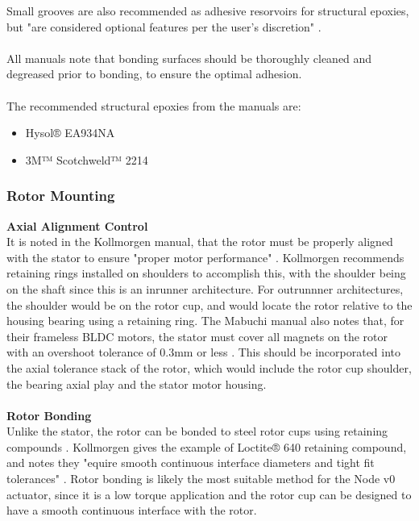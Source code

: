 \documentclass[internal]{../../classes/nervtech-research}
\begin{document}
Small grooves are also recommended as adhesive resorvoirs for structural epoxies, but "are considered optional features per the user's discretion" \cite{KollmorgenManual}.
\\\\
All manuals note that bonding surfaces should be thoroughly cleaned and degreased prior to bonding, to ensure the optimal adhesion.
\\\\
The recommended structural epoxies from the manuals are:
\begin{itemize}
  \item Hysol® EA934NA \cite{KollmorgenManual}
  \item 3M™ Scotchweld™ 2214 \cite{KollmorgenManual}
\end{itemize}

\subsubsection{Rotor Mounting}
\textbf{Axial Alignment Control}
\\
It is noted in the Kollmorgen manual, that the rotor must be properly aligned with the stator to ensure "proper motor performance" \cite{KollmorgenManual}.
Kollmorgen recommends retaining rings installed on shoulders to accomplish this, with the shoulder being on the shaft since this is an inrunner architecture.
For outrunnner architectures, the shoulder would be on the rotor cup, and would locate the rotor relative to the housing bearing using a retaining ring.
The Mabuchi manual also notes that, for their frameless BLDC motors, the stator must cover all magnets on the rotor with an overshoot tolerance of 0.3mm or less \cite{MabuchiManual}.
This should be incorporated into the axial tolerance stack of the rotor, which would include the rotor cup shoulder, the bearing axial play and the stator motor housing.
\\\\
\textbf{Rotor Bonding}
\\
Unlike the stator, the rotor can be bonded to steel rotor cups using retaining compounds \cite{MacconManual} \cite{KollmorgenManual}.
Kollmorgen gives the example of Loctite® 640 retaining compound, and notes they "equire smooth continuous interface diameters and tight fit tolerances" \cite{KollmorgenManual}.
Rotor bonding is likely the most suitable method for the Node v0 actuator, since it is a low torque application and the rotor cup can be designed to have a smooth continuous interface with the rotor.
\end{document}
